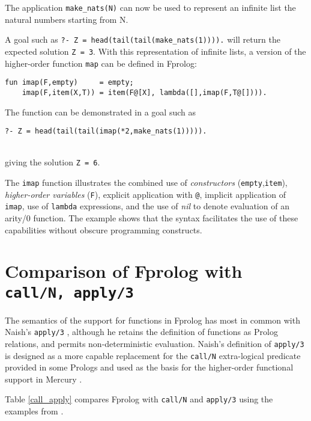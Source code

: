 \documentclass[a4paper,11pt,twoside]{article}
\begin{document}
The application \texttt{make\_{}nats(N)} can now be used to represent an
infinite list the natural numbers starting from N.

A goal such as \texttt{?- Z = head(tail(tail(make\_{}nats(1)))).} will
return the expected solution \texttt{Z = 3}.
With this representation of infinite lists, a version of the
higher-order function \texttt{map} can be defined in Fprolog:
\begin{verbatim}
fun imap(F,empty)     = empty;
    imap(F,item(X,T)) = item(F@[X], lambda([],imap(F,T@[]))).
\end{verbatim}
The function can be demonstrated in a goal such as\\
\centerline{\texttt{?- Z = head(tail(tail(imap(*2,make\_{}nats(1))))).}}\\
giving the solution \texttt{Z = 6}.

The \texttt{imap} function illustrates the combined use of
\textit{constructors} (\texttt{empty},\texttt{item}), \textit{higher-order
variables} (\texttt{F}), explicit application with \texttt{@}, implicit
application of \texttt{imap}, use of \texttt{lambda} expressions, and the
use of \textit{nil} to denote evaluation of an arity/0 function.
The example shows that the syntax facilitates the use of these capabilities
without obscure programming constructs.


\section{Comparison of Fprolog with \texttt{call/N, apply/3}} %

The semantics of the support for functions in Fprolog has most in
common with Naish's \texttt{apply/3} \cite{Nai96}, although he retains the
definition of functions as Prolog relations, and permits non-deterministic
evaluation.  Naish's definition of \texttt{apply/3} is designed as a more
capable replacement for the \texttt{call/N} extra-logical predicate provided
in some Prologs and used as the basis for the higher-order functional
support in Mercury \cite{SHC95}.

Table \ref{call_apply} compares Fprolog with \texttt{call/N} and \texttt{apply/3}
using the examples from \cite{Nai96}.
\end{document}
